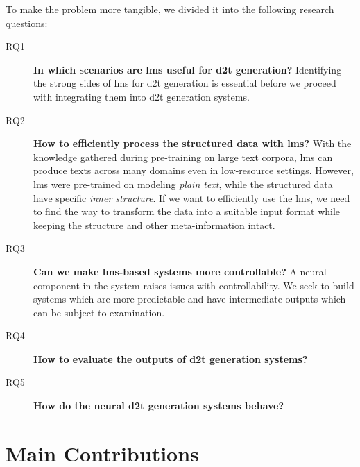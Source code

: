 To make the problem more tangible, we divided it into the following research questions:

\begin{description}
    \item[RQ1] \textbf{In which scenarios are \acp{lm} useful for \ac{d2t} generation?} Identifying the strong sides of \acp{lm} for \ac{d2t} generation is essential before we proceed with integrating them into \ac{d2t} generation systems.
    \item[RQ2] \textbf{How to efficiently process the structured data with \acp{lm}?} With the knowledge gathered during pre-training on large text corpora, \acp{lm} can produce texts across many domains even in low-resource settings. However, \acp{lm} were pre-trained on modeling \textit{plain text}, while the structured data have specific \textit{inner structure}. If we want to efficiently use the \acp{lm}, we need to find the way to transform the data into a suitable input format while keeping the structure and other meta-information intact.
    \item[RQ3] \textbf{Can we make \acp{lm}-based systems more controllable?} A neural component in the system raises issues with controllability. We seek to build systems which are more predictable and have intermediate outputs which can be subject to examination.
    \item[RQ4] \textbf{How to evaluate the outputs of \ac{d2t} generation systems?}
    \item[RQ5] \textbf{How do the neural \ac{d2t} generation systems behave?}
\end{description}



\section{Main Contributions}
\label{sec:contributions}


